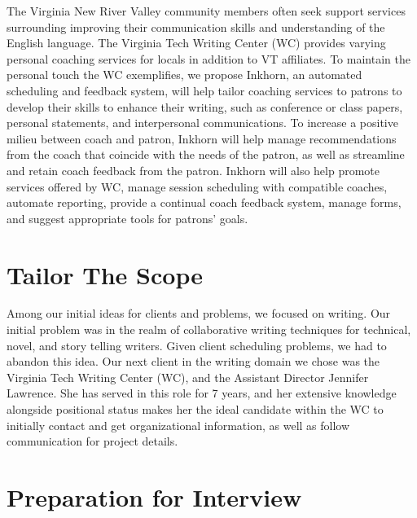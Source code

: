 \documentclass[12pt]{article} %
\begin{document}
The Virginia New River Valley community members often seek support services surrounding improving their communication skills and understanding of the English language.
The Virginia Tech Writing Center (WC) provides varying personal coaching services for locals in addition to VT affiliates.
To maintain the personal touch the WC exemplifies, we propose Inkhorn, an automated scheduling and feedback system, will help tailor coaching services to patrons to develop their skills to enhance their writing, such as conference or class papers, personal statements, and interpersonal communications. 
To increase a positive milieu between coach and patron, Inkhorn will help manage recommendations from the coach that coincide with the needs of the patron, as well as streamline and retain coach feedback from the patron.
Inkhorn will also help promote services offered by WC, manage session scheduling with compatible coaches, automate reporting, provide a continual coach feedback system, manage forms, and suggest appropriate tools for patrons' goals.

\section{Tailor The Scope} %
  Among our initial ideas for clients and problems, we focused on writing.
  Our initial problem was in the realm of collaborative writing techniques for technical, novel, and story telling writers.
  Given client scheduling problems, we had to abandon this idea.
  Our next client in the writing domain we chose was the Virginia Tech Writing Center (WC), and the Assistant Director Jennifer Lawrence.
  She has served in this role for 7 years, and her extensive knowledge alongside positional status makes her the ideal candidate within the WC to initially contact and get organizational information, as well as follow communication for project details.

\section{Preparation for Interview} %
\end{document}
